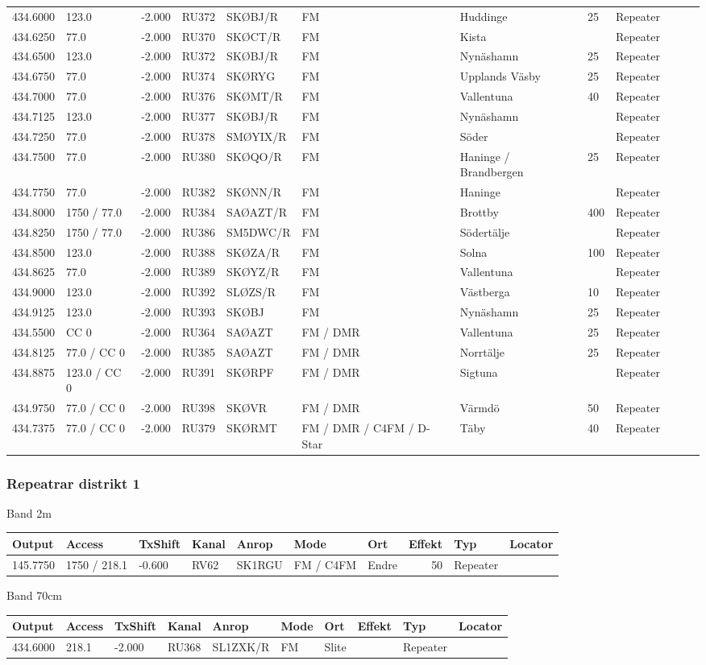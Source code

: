 \begin{longtable}[l]{lllllp{1.5cm}lp{1.5cm}lrlr}
434.6000&123.0&-2.000&RU372&SKØBJ/R&FM&Huddinge&25&Repeater&\\
434.6250&77.0&-2.000&RU370&SKØCT/R&FM&Kista&&Repeater&\\
434.6500&123.0&-2.000&RU372&SKØBJ/R&FM&Nynäshamn&25&Repeater&\\
434.6750&77.0&-2.000&RU374&SKØRYG&FM&Upplands Väsby&25&Repeater&\\
434.7000&77.0&-2.000&RU376&SKØMT/R&FM&Vallentuna&40&Repeater&\\
434.7125&123.0&-2.000&RU377&SKØBJ/R&FM&Nynäshamn&&Repeater&\\
434.7250&77.0&-2.000&RU378&SMØYIX/R&FM&Söder&&Repeater&\\
434.7500&77.0&-2.000&RU380&SKØQO/R&FM&Haninge / Brandbergen&25&Repeater&\\
434.7750&77.0&-2.000&RU382&SKØNN/R&FM&Haninge&&Repeater&\\
434.8000&1750 / 77.0&-2.000&RU384&SAØAZT/R&FM&Brottby&400&Repeater&\\
434.8250&1750 / 77.0&-2.000&RU386&SM5DWC/R&FM&Södertälje&&Repeater&\\
434.8500&123.0&-2.000&RU388&SKØZA/R&FM&Solna&100&Repeater&\\
434.8625&77.0&-2.000&RU389&SKØYZ/R&FM&Vallentuna&&Repeater&\\
434.9000&123.0&-2.000&RU392&SLØZS/R&FM&Västberga&10&Repeater&\\
434.9125&123.0&-2.000&RU393&SKØBJ&FM&Nynäshamn&25&Repeater&\\
434.5500&CC 0&-2.000&RU364&SAØAZT&FM / DMR&Vallentuna&25&Repeater&\\
434.8125&77.0 / CC 0&-2.000&RU385&SAØAZT&FM / DMR&Norrtälje&25&Repeater&\\
434.8875&123.0 / CC 0&-2.000&RU391&SKØRPF&FM / DMR&Sigtuna&&Repeater&\\
434.9750&77.0 / CC 0&-2.000&RU398&SKØVR&FM / DMR&Värmdö&50&Repeater&\\
434.7375&77.0 / CC 0&-2.000&RU379&SKØRMT&FM / DMR / C4FM / D-Star&Täby&40&Repeater&\\
\end{longtable}
\clearpage
\subsubsection{Repeatrar distrikt 1}
\large{Band 2m}
\begin{longtable}{lllllllrlr}
Output & Access & TxShift & Kanal & Anrop & Mode & Ort & Effekt & Typ & Locator \\ \hline
145.7750&1750 / 218.1&-0.600&RV62&SK1RGU&FM / C4FM&Endre&50&Repeater&\\
\end{longtable}
\large{Band 70cm}
\begin{longtable}{lllllllrlr}
Output & Access & TxShift & Kanal & Anrop & Mode & Ort & Effekt & Typ & Locator \\ \hline
434.6000&218.1&-2.000&RU368&SL1ZXK/R&FM&Slite&&Repeater&\\
\end{longtable}
\clearpage
